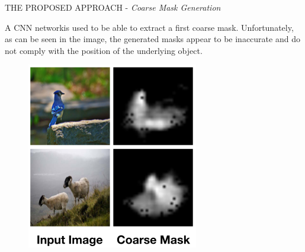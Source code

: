 \begin{frame}{THE PROPOSED APPROACH - \emph{Coarse Mask Generation}}
    \begin{minipage}{\linewidth}
        \centering
        \begin{minipage}{0.45\linewidth}
            A CNN network\footnotemark is used to be able 
            to extract a first coarse mask. 
            Unfortunately, as can be seen in 
            the image, the generated masks 
            appear to be inaccurate and do 
            not comply with the position of 
            the underlying object.
        \end{minipage}
        \hspace{0.05\linewidth}
        \begin{minipage}{0.45\linewidth}
            \begin{figure}[h!]
                \centering
                \includegraphics[width = 1 \linewidth]{images/paper6/coarse mask.png}
                \centering
            \end{figure}
        \end{minipage}
    \end{minipage}
\end{frame}


